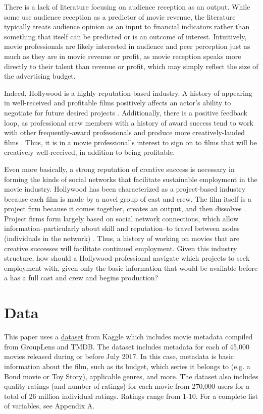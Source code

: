 \documentclass[12pt,english]{article}
\begin{document}
There is a lack of literature focusing on audience reception as an output. While some \citep{apala} use audience reception as a predictor of movie revenue, the literature typically treats audience opinion as an input to financial indicators rather than something that itself can be predicted or is an outcome of interest. Intuitively, movie professionals are likely interested in audience and peer perception just as much as they are in movie revenue or profit, as movie reception speaks more directly to their talent than revenue or profit, which may simply reflect the size of the advertising budget.

Indeed, Hollywood is a highly reputation-based industry. A history of appearing in well-received and profitable films positively affects an actor's ability to negotiate for future desired projects \citep{ebbers}. Additionally, there is a positive feedback loop, as professional crew members with a history of award success tend to work with other frequently-award professionals and produce more creatively-lauded films \citep{cattani}. Thus, it is in a movie professional's interest to sign on to films that will be creatively well-received, in addition to being profitable.

Even more basically, a strong reputation of creative success is necessary in forming the kinds of social networks that facilitate sustainable employment in the movie industry. Hollywood has been characterized as a project-based industry because each film is made by a novel group of cast and crew. The film itself is a project firm because it comes together, creates an output, and then dissolves \citep{ferriani, jones}. Project firms form largely based on social network connections, which allow information--particularly about skill and reputation--to travel between nodes (individuals in the network) \citep{jones}. Thus, a history of working on movies that are creative successes will facilitate continued employment. Given this industry structure, how should a Hollywood professional navigate which projects to seek employment with, given only the basic information that would be available before a has a full cast and crew and begins production?


\section{Data}
This paper uses a \href{https://www.kaggle.com/rounakbanik/the-movies-dataset#movies_metadata.csv}{dataset} from Kaggle which includes movie metadata compiled from GroupLens and TMDB. The dataset includes metadata for each of 45,000 movies released during or before July 2017. In this case, metadata is basic information about the film, such as its budget, which series it belongs to (e.g. a Bond movie or Toy Story), applicable genres, and more. The dataset also includes quality ratings (and number of ratings) for each movie from 270,000 users for a total of 26 million individual ratings. Ratings range from 1-10. For a complete list of variables, see Appendix A. 
\end{document}
